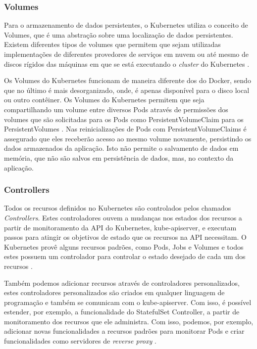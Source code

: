 \subsubsection{Volumes}

Para o armazenamento de dados persistentes, o Kubernetes utiliza o conceito
de Volumes, que é uma abstração sobre uma localização de dados
persistentes. Existem diferentes tipos de volumes que permitem que sejam
utilizadas implementações de diferentes provedores de serviços em nuvem ou
até mesmo de discos rígidos das máquinas em que se está executando o
\textit{cluster} do Kubernetes \cite{kubernetes:volumes}.

Os Volumes do Kubernetes funcionam de maneira diferente dos do
Docker, sendo que no último é mais desorganizado, onde, é apenas disponível para o
disco local ou outro contêiner. Os Volumes do Kubernetes permitem
que seja compartilhando um volume entre diversos Pods através de permissões
dos volumes que são solicitadas para os Pods como PersistentVolumeClaim para os
PersistentVolumes \cite{kubernetes:persistent-volumes}. Nas reinicializações
de Pods com PersistentVolumeClaims é assegurado que eles receberão acesso
ao mesmo volume novamente, persistindo os dados armazenados da aplicação.
Isto não permite o salvamento de dados em memória, que não são salvos em
persistência de dados, mas, no contexto da aplicação.

\subsubsection{Controllers}

Todos os recursos definidos no Kubernetes são controlados pelos chamados
\textit{Controllers}. Estes controladores ouvem a mudanças nos estados dos recursos
a partir de monitoramento da API do Kubernetes, kube-apiserver, e executam passos
para atingir os objetivos de estado que os recursos na API necessitam. O
Kubernetes provê alguns recursos padrões, como Pods, Jobs e Volumes e
todos estes possuem um controlador para controlar o estado desejado de
cada um dos recursos \cite{kubernetes:controllers}.

Também podemos adicionar recursos através de controladores personalizados,
estes controladores personalizados são criados em qualquer linguagem de
programação e também se comunicam com o kube-apiserver. Com isso, é
possível estender, por exemplo, a funcionalidade do StatefulSet Controller,
a partir de monitoramento dos recursos que ele administra. Com isso, podemos,
por exemplo, adicionar novas funcionalidades a recursos padrões para
monitorar Pods e criar funcionalidades como servidores de \textit{reverse proxy} \cite{kubernetes:controllers}.

